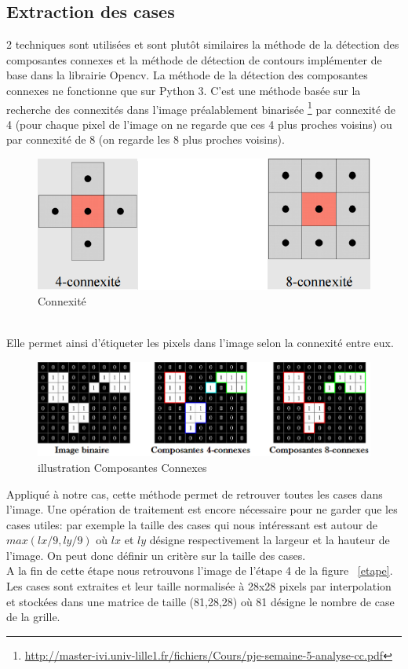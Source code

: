 \documentclass[12pt]{article}
\begin{document}
\newpage
\subsection{Extraction des cases}
2 techniques sont utilisées et sont plutôt similaires la méthode de la détection des composantes connexes et la méthode de détection de contours implémenter de base dans la librairie Opencv. La méthode de la détection des composantes connexes ne fonctionne que sur Python 3. C'est une méthode basée sur la recherche des connexités dans l'image préalablement binarisée \footnote{\url{http://master-ivi.univ-lille1.fr/fichiers/Cours/pje-semaine-5-analyse-cc.pdf}} par connexité de 4 (pour chaque pixel de l'image on ne regarde que ces 4 plus proches voisins) ou par connexité de 8 (on regarde les 8 plus proches voisins).
\begin{figure}[!h]
	\centering
   	\includegraphics[scale = 0.48]{4-8c.png}
   	\caption{\label{cc} Connexité }
\end{figure}\\
Elle permet ainsi d'étiqueter les pixels dans l'image selon la connexité entre eux.\\
\begin{figure}[!h]
	\centering
   	\includegraphics[scale = 0.6]{ecc.png}
   	\caption{\label{ecc} illustration Composantes Connexes }
\end{figure}
Appliqué à notre cas, cette méthode permet de retrouver toutes les cases dans l'image. Une opération de traitement est encore nécessaire pour ne garder que les cases utiles: par exemple la taille des cases qui nous intéressant est autour de $max(lx/9,ly/9)$ où $lx$ et $ly$ désigne respectivement la largeur et la hauteur de l'image. On peut donc définir un critère sur la taille des cases.\\
A la fin de cette étape nous retrouvons l'image de l'étape 4 de la figure ~\ref{etape}. Les cases sont extraites et leur taille normalisée à 28x28 pixels par interpolation et stockées dans une matrice de taille (81,28,28) où 81 désigne le nombre de case de la grille.
\end{document}
